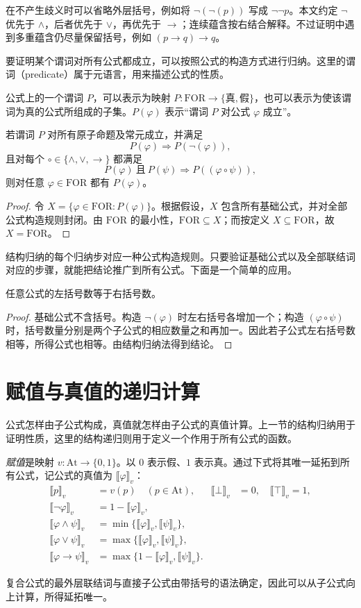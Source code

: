 \documentclass[lang=cn,a4paper,fontset=none,zihao=false,10pt,openany,twoside]{beautybook}
\numberwithin{algorithm}{chapter}
\newcommand{\FOR}{\mathrm{FOR}}
\newcommand{\At}{\mathrm{At}}
\newcommand{\val}[1]{\llbracket #1\rrbracket_v}
\begin{document}
在不产生歧义时可以省略外层括号，例如将 $\neg(\neg(p))$ 写成 $\neg\neg p$。本文约定 $\neg$ 优先于 $\wedge$，后者优先于 $\vee$，再优先于 $\to$；连续蕴含按右结合解释。不过证明中遇到多重蕴含仍尽量保留括号，例如 $(p\to q)\to q$。

要证明某个谓词对所有公式都成立，可以按照公式的构造方式进行归纳。这里的谓词（predicate）属于元语言，用来描述公式的性质。
\begin{definition}[公式的谓词]
公式上的一个谓词 $P$，可以表示为映射 $P:\FOR\to\{\text{真},\text{假}\}$，也可以表示为使该谓词为真的公式所组成的子集。$P(\varphi)$ 表示“谓词 $P$ 对公式 $\varphi$ 成立”。
\end{definition}
\begin{proposition}[结构归纳原理]
若谓词 $P$ 对所有原子命题及常元成立，并满足
\[
 P(\varphi)\Rightarrow P(\neg(\varphi)),
\]
且对每个 $\circ\in\{\wedge,\vee,\to\}$ 都满足
\[
 P(\varphi)\ \text{且}\ P(\psi)\Rightarrow P((\varphi\circ\psi)),
\]
则对任意 $\varphi\in\FOR$ 都有 $P(\varphi)$。
\end{proposition}
\begin{proof}
令 $X=\{\varphi\in\FOR:P(\varphi)\}$。根据假设，$X$ 包含所有基础公式，并对全部公式构造规则封闭。由 $\FOR$ 的最小性，$\FOR\subseteq X$；而按定义 $X\subseteq\FOR$，故 $X=\FOR$。
\end{proof}
结构归纳的每个归纳步对应一种公式构造规则。只要验证基础公式以及全部联结词对应的步骤，就能把结论推广到所有公式。下面是一个简单的应用。

\begin{corollary}
任意公式的左括号数等于右括号数。
\end{corollary}
\begin{proof}
基础公式不含括号。构造 $\neg(\varphi)$ 时左右括号各增加一个；构造 $(\varphi\circ\psi)$ 时，括号数量分别是两个子公式的相应数量之和再加一。因此若子公式左右括号数相等，所得公式也相等。由结构归纳法得到结论。
\end{proof}
\section{赋值与真值的递归计算}\label{sec:prop-semantics}
公式怎样由子公式构成，真值就怎样由子公式的真值计算。上一节的结构归纳用于证明性质，这里的结构递归则用于定义一个作用于所有公式的函数。
\begin{definition}
\emph{赋值}是映射 $v:\At\to\{0,1\}$。以 $0$ 表示假、$1$ 表示真。通过下式将其唯一延拓到所有公式，记公式的真值为 $\val{\varphi}$：
\begin{align*}
 \val p&=v(p)\quad(p\in\At),&\val\bot&=0,\quad\val\top=1,\\
 \val{\neg\varphi}&=1-\val\varphi,\\
 \val{\varphi\wedge\psi}&=\min\{\val\varphi,\val\psi\},\\
 \val{\varphi\vee\psi}&=\max\{\val\varphi,\val\psi\},\\
 \val{\varphi\to\psi}&=\max\{1-\val\varphi,\val\psi\}.
\end{align*}
\end{definition}
复合公式的最外层联结词与直接子公式由带括号的语法确定，因此可以从子公式向上计算，所得延拓唯一。
\end{document}
